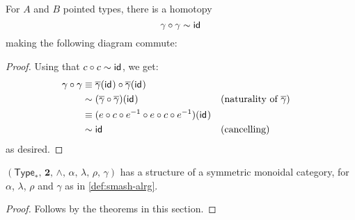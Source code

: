 \documentclass{article}
\renewcommand{\smash}{\wedge}
\renewcommand{\o}{\ensuremath{\circ}}
\newcommand{\sy}{^{-1}}
\newcommand{\gammabar}{\overline{\gamma}}
\newcommand{\pType}{\mathsf{Type}_\ast}
\newcommand{\two}{\mathbf{2}}
\begin{document}
\begin{thm}\label{thm:smash-double-braiding}
	For $A$ and $B$ pointed types, there is a homotopy
	\[\gamma \o \gamma \sim \idfunc\]
	making the following diagram commute:
	\begin{center}
	\end{center}
\end{thm}
\begin{proof}
	Using that $c \o c \sim \idfunc$, we get:
	\begin{align*}
		\gamma \o \gamma
		&\judgeq \gammabar(\idfunc) \o \gammabar(\idfunc)\\
		&\sim (\gammabar \o \gammabar)(\idfunc) &&\text{(naturality of $\gammabar$)}\\
		&\judgeq (e \o c \o e\sy \o e \o c \o e\sy)(\idfunc)\\
		&\sim \idfunc &&\text{(cancelling)}
	\end{align*}
	as desired.
\end{proof}

\begin{cor}
	$(\pType,\, \two,\, \smash,\, \alpha,\, \lambda,\, \rho,\, \gamma)$ has a structure of a symmetric monoidal category, for $\alpha$, $\lambda$, $\rho$ and $\gamma$ as in \autoref{def:smash-alrg}.
\end{cor}
\begin{proof}
	Follows by the theorems in this section.
\end{proof}
\end{document}
